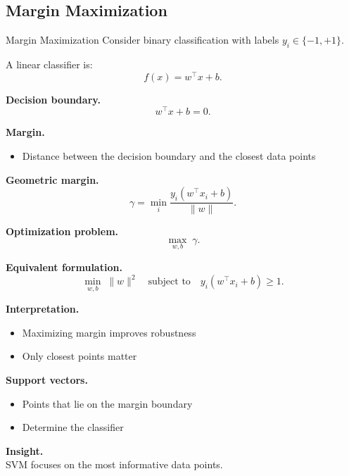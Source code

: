 \documentclass[aspectratio=169,11pt]{beamer}
\begin{document}
\subsection{Margin Maximization}
\begin{frame}[t,allowframebreaks]{Margin Maximization}
\small
Consider binary classification with labels $y_i \in \{-1, +1\}$.

A linear classifier is:
\[
f(x) = w^\top x + b.
\]

\textbf{Decision boundary.}\\ \[
w^\top x + b = 0.
\]

\textbf{Margin.}\\ \begin{itemize}
    \item Distance between the decision boundary and the closest data points
\end{itemize}

\textbf{Geometric margin.}\\ \[
\gamma = \min_i \frac{y_i (w^\top x_i + b)}{\|w\|}.
\]

\textbf{Optimization problem.}\\ \[
\max_{w,b} \; \gamma.
\]

\textbf{Equivalent formulation.}\\ \[
\min_{w,b} \; \|w\|^2 \quad \text{subject to} \quad y_i(w^\top x_i + b) \geq 1.
\]

\textbf{Interpretation.}\\ \begin{itemize}
    \item Maximizing margin improves robustness
    \item Only closest points matter
\end{itemize}

\textbf{Support vectors.}\\ \begin{itemize}
    \item Points that lie on the margin boundary
    \item Determine the classifier
\end{itemize}

\textbf{Insight.}\\ SVM focuses on the most informative data points.
\end{frame}
\end{document}
